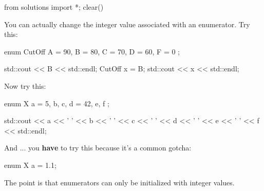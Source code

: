\begin{python0}
from solutions import *; clear()
\end{python0}

You can actually change the integer value associated with an enumerator.
Try this:

\begin{consolethree}[escapeinside=||]
enum CutOff
{
    A = 90, B = 80, C = 70, D = 60, F = 0
};

std::cout << B << std::endl;
CutOff x = B;
std::cout << x << std::endl;
\end{consolethree}

Now try this:

\begin{consolethree}[escapeinside=||]
enum X
{
    a = 5, b, c, d = 42, e, f
};

std::cout << a << ' ' << b << ' ' << c << ' '
          << d << ' ' << e << ' ' << f << std::endl;
\end{consolethree}

And ... you \textbf{have} to try this because
it's a common gotcha:

\begin{consolethree}[escapeinside=||]
enum X {a = 1.1};
\end{consolethree}

The point is that enumerators can only be initialized with integer
values.




